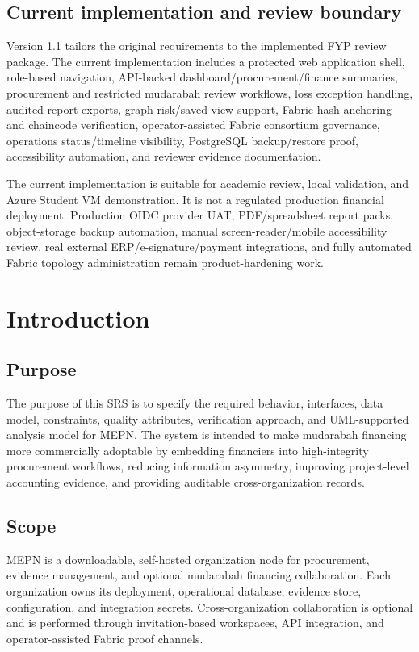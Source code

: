 \documentclass[11pt,a4paper]{article}
\newcommand{\systemshort}{MEPN}
\begin{document}
\subsection{Current implementation and review boundary}
Version 1.1 tailors the original requirements to the implemented FYP review package. The current implementation includes a protected web application shell, role-based navigation, API-backed dashboard/procurement/finance summaries, procurement and restricted mudarabah review workflows, loss exception handling, audited report exports, graph risk/saved-view support, Fabric hash anchoring and chaincode verification, operator-assisted Fabric consortium governance, operations status/timeline visibility, PostgreSQL backup/restore proof, accessibility automation, and reviewer evidence documentation.

The current implementation is suitable for academic review, local validation, and Azure Student VM demonstration. It is not a regulated production financial deployment. Production OIDC provider UAT, PDF/spreadsheet report packs, object-storage backup automation, manual screen-reader/mobile accessibility review, real external ERP/e-signature/payment integrations, and fully automated Fabric topology administration remain product-hardening work.

\section{Introduction}

\subsection{Purpose}
The purpose of this SRS is to specify the required behavior, interfaces, data model, constraints, quality attributes, verification approach, and UML-supported analysis model for \systemshort{}. The system is intended to make mudarabah financing more commercially adoptable by embedding financiers into high-integrity procurement workflows, reducing information asymmetry, improving project-level accounting evidence, and providing auditable cross-organization records.

\subsection{Scope}
\systemshort{} is a downloadable, self-hosted organization node for procurement, evidence management, and optional mudarabah financing collaboration. Each organization owns its deployment, operational database, evidence store, configuration, and integration secrets. Cross-organization collaboration is optional and is performed through invitation-based workspaces, API integration, and operator-assisted Fabric proof channels.
\end{document}
